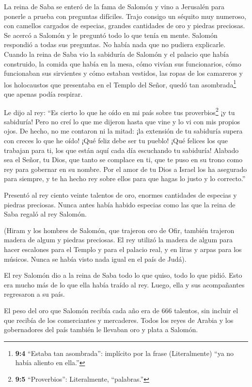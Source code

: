  La reina de Saba se enteró de la fama de Salomón y vino a
Jerusalén para ponerle a prueba con preguntas difíciles. Trajo consigo
un séquito muy numeroso, con camellos cargados de especias, grandes
cantidades de oro y piedras preciosas. Se acercó a Salomón y le preguntó
todo lo que tenía en mente.  Salomón respondió a todas sus
preguntas. No había nada que no pudiera explicarle.  Cuando
la reina de Saba vio la sabiduría de Salomón y el palacio que había
construido,  la comida que había en la mesa, cómo vivían sus
funcionarios, cómo funcionaban sus sirvientes y cómo estaban vestidos,
las ropas de los camareros y los holocaustos que presentaba en el Templo
del Señor, quedó tan asombrada\footnote{\textbf{9:4} ``Estaba tan
  asombrada'': implícito por la frase (Literalmente) ``ya no había
  aliento en ella.''} que apenas podía respirar.

 Le dijo al rey: ``Es cierto lo que he oído en mi país sobre
tus proverbios\footnote{\textbf{9:5} ``Proverbios'': Literalmente,
  ``palabras.''} ¡y tu sabiduría!  Pero no creí lo que me
dijeron hasta que vine y lo vi con mis propios ojos. De hecho, no me
contaron ni la mitad: ¡la extensión de tu sabiduría supera con creces lo
que he oído!  ¡Qué feliz debe ser tu pueblo! ¡Qué felices
los que trabajan para ti, los que están aquí cada día escuchando tu
sabiduría!  Alabado sea el Señor, tu Dios, que tanto se
complace en ti, que te puso en su trono como rey para gobernar en su
nombre. Por el amor de tu Dios a Israel los ha asegurado para siempre, y
te ha hecho rey sobre ellos para que hagas lo justo y lo correcto.''

 Presentó al rey ciento veinte talentos de oro, enormes
cantidades de especias y piedras preciosas. Nunca antes había habido
especias como las que la reina de Saba regaló al rey Salomón.

 (Hiram y los hombres de Salomón, que trajeron oro de Ofir,
también trajeron madera de algum y piedras preciosas.  El
rey utilizó la madera de algum para hacer escalones para el Templo y
para el palacio real, y en liras y arpas para los músicos. Nunca se
había visto nada igual en el país de Judá).

 El rey Salomón dio a la reina de Saba todo lo que quiso,
todo lo que pidió. Esto era mucho más de lo que ella había traído al
rey. Luego, ella y sus acompañantes regresaron a su país.

 El peso del oro que Salomón recibía cada año era de 666
talentos,  sin incluir el que recibía de los comerciantes y
mercaderes. Todos los reyes de Arabia y los gobernadores del país
también le llevaban oro y plata a Salomón.

